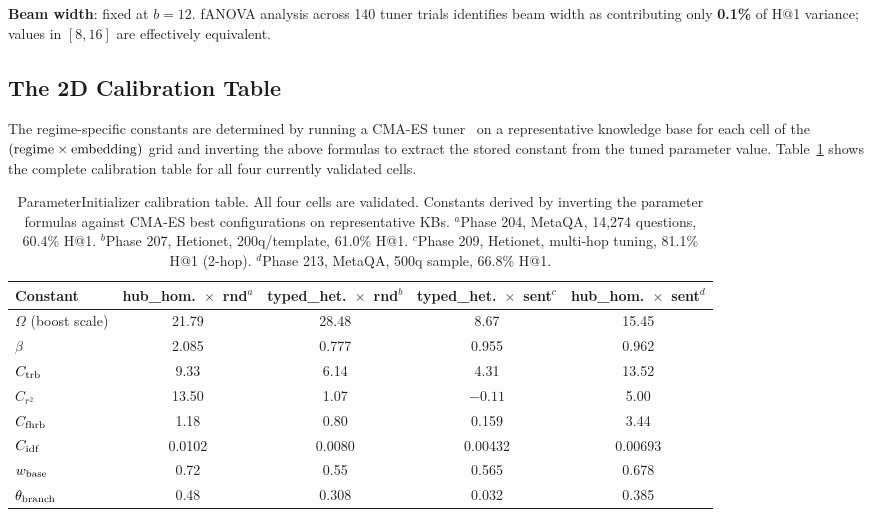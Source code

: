 \documentclass[11pt,a4paper]{article}
\begin{document}
\noindent\textbf{Beam width}: fixed at $b = 12$.
fANOVA analysis across 140 tuner trials identifies beam width as
contributing only \textbf{0.1\%} of H@1 variance; values in $[8, 16]$
are effectively equivalent.

\subsection{The 2D Calibration Table}

The regime-specific constants are determined by running a CMA-ES
tuner~\cite{hansen2016cma} on a representative knowledge base for each
cell of the $({\rm regime} \times {\rm embedding})$ grid and inverting the
above formulas to extract the stored constant from the tuned parameter value.
Table~\ref{tab:regime_constants} shows the complete calibration table
for all four currently validated cells.

\begin{table}[t]
\centering
\caption{%
  ParameterInitializer calibration table. All four cells are validated.
  Constants derived by inverting the parameter formulas against CMA-ES best
  configurations on representative KBs.
  $^a$Phase 204, MetaQA, 14,274 questions, 60.4\% H@1.
  $^b$Phase 207, Hetionet, 200q/template, 61.0\% H@1.
  $^c$Phase 209, Hetionet, multi-hop tuning, 81.1\% H@1 (2-hop).
  $^d$Phase 213, MetaQA, 500q sample, 66.8\% H@1.
}
\label{tab:regime_constants}
\small
\begin{tabular}{lcccc}
\toprule
\textbf{Constant} &
\textbf{hub\_hom.~$\times$~rnd}$^a$ &
\textbf{typed\_het.~$\times$~rnd}$^b$ &
\textbf{typed\_het.~$\times$~sent}$^c$ &
\textbf{hub\_hom.~$\times$~sent}$^d$ \\
\midrule
$\Omega$ (boost scale)     & 21.79  & 28.48  &  8.67  & 15.45 \\
$\beta$                    &  2.085 &  0.777 &  0.955 &  0.962 \\
$C_{\rm trb}$              &  9.33  &  6.14  &  4.31  & 13.52 \\
$C_{r^2}$                  & 13.50  &  1.07  & $-0.11$& 5.00 \\
$C_{\rm fhrb}$             &  1.18  &  0.80  &  0.159 &  3.44 \\
$C_{\rm idf}$              & 0.0102 & 0.0080 & 0.00432& 0.00693 \\
$w_{\rm base}$             &  0.72  &  0.55  &  0.565 &  0.678 \\
$\theta_{\rm branch}$      &  0.48  &  0.308 &  0.032 &  0.385 \\
\bottomrule
\end{tabular}
\end{table}
\end{document}
